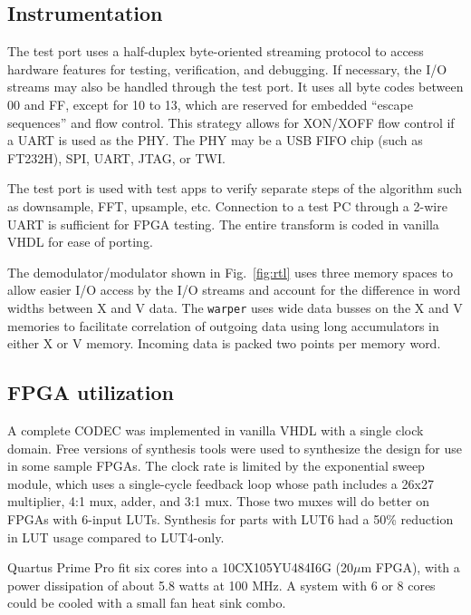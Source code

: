\subsection{Instrumentation}

The test port uses a half-duplex byte-oriented streaming protocol to access
hardware features for testing, verification, and debugging.
If necessary, the I/O streams may also be handled through the test port.
It uses all byte codes between 00 and FF, except for 10 to 13,
which are reserved for embedded ``escape sequences'' and flow control.
This strategy allows for XON/XOFF flow control if a UART is used as the PHY.
The PHY may be a USB FIFO chip (such as FT232H), SPI, UART, JTAG, or TWI.

The test port is used with test apps to verify separate steps of the
algorithm such as downsample, FFT, upsample, etc.
Connection to a test PC through a 2-wire UART is sufficient for FPGA testing.
The entire transform is coded in vanilla VHDL for ease of porting.

The demodulator/modulator shown in Fig.~\ref{fig:rtl} uses three memory
spaces to allow easier I/O access by the I/O streams and account for the
difference in word widths between X and V data.
The \verb|warper| uses wide data busses on the X and V memories to facilitate
correlation of outgoing data using long accumulators in either X or V memory.
Incoming data is packed two points per memory word.

\subsection {FPGA utilization}

A complete CODEC was implemented in vanilla VHDL with a single clock domain.
Free versions of synthesis tools were used to synthesize the design for use in
some sample FPGAs.
The clock rate is limited by the exponential sweep module,
which uses a single-cycle feedback loop whose path includes a 26x27 multiplier,
4:1 mux, adder, and 3:1 mux. Those two muxes will do better on FPGAs with
6-input LUTs. Synthesis for parts with LUT6 had a 50\% reduction in LUT usage
compared to LUT4-only.

Quartus Prime Pro fit six cores into a 10CX105YU484I6G (20$\mu$m FPGA),
with a power dissipation of about 5.8 watts at 100 MHz.
A system with 6 or 8 cores could be cooled with a small fan heat sink combo.

